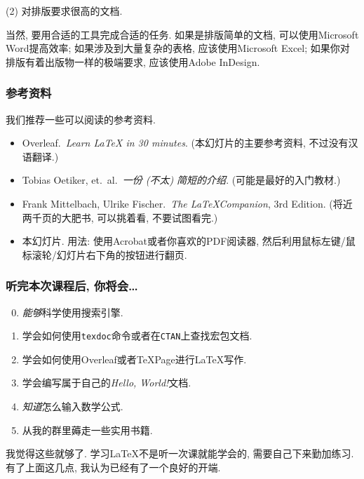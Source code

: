\documentclass{beamer}
\begin{document}
\begin{frame}
    (2) 对排版要求很高的文档.\pause

    当然, 要用合适的工具完成合适的任务.
    如果是排版简单的文档, 可以使用Microsoft Word提高效率; 如果涉及到大量复杂的表格, 应该使用Microsoft Excel; 如果你对排版有着出版物一样的极端要求, 应该使用Adobe InDesign.
\end{frame}

\begin{frame}
    \frametitle{参考资料}
    我们推荐一些可以阅读的参考资料.\pause
    \begin{itemize}
        \item<2-> Overleaf.\ \emph{Learn LaTeX in 30 minutes}.
        (本幻灯片的主要参考资料, 不过没有汉语翻译.)
        \item<3-> Tobias Oetiker, et.~al.\ \emph{一份 (不太) 简短的\LaTeXe{}介绍}.
        (可能是最好的入门教材.)
        \item<4-> Frank Mittelbach, Ulrike Fischer.\ \emph{The \LaTeX Companion}, 3rd Edition.
        (将近两千页的大肥书, 可以挑着看, 不要试图看完.)
        \item<5-> 本幻灯片. 用法: 使用Acrobat或者你喜欢的PDF阅读器, 然后利用鼠标左键/鼠标滚轮/幻灯片右下角的按钮进行翻页.
    \end{itemize}
\end{frame}

\begin{frame}
    \frametitle{听完本次课程后, 你将会\dots}
    \begin{enumerate}[(1)]
        \setcounter{enumi}{-1}
        \item \emph{能够}科学使用搜索引擎.
        \item 学会如何使用\Verb|texdoc|命令或者在\Verb|CTAN|上查找宏包文档.
        \item 学会如何使用Overleaf或者\TeX{}Page进行\LaTeX{}写作.
        \item 学会编写属于自己的\emph{Hello, World!}文档.
        \item \emph{知道}怎么输入数学公式.
        \item 从我的群里薅走一些实用书籍.
    \end{enumerate}\pause
    我觉得这些就够了.
    学习\LaTeX{}不是听一次课就能学会的, 需要自己下来勤加练习.
    有了上面这几点, 我认为已经有了一个良好的开端.
\end{frame}
\end{document}

